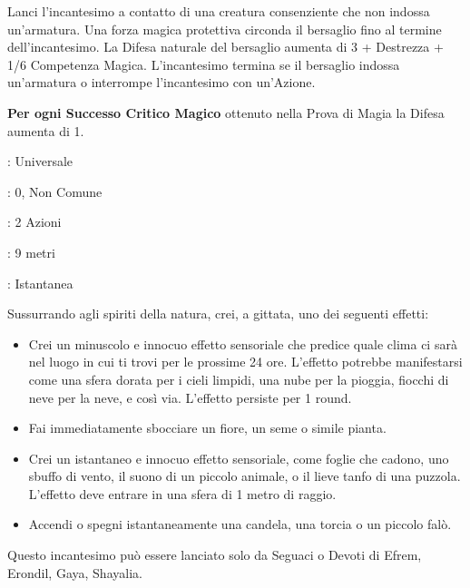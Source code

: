 \begin{multicols}{2}
Lanci l'incantesimo a contatto di una creatura consenziente che non indossa un'armatura. Una forza magica protettiva circonda il bersaglio fino al termine dell'incantesimo. La Difesa naturale del bersaglio aumenta di 3 + Destrezza + 1/6 Competenza Magica. L'incantesimo termina se il bersaglio indossa un'armatura o interrompe l'incantesimo con un'Azione.

\textbf{Per ogni Successo Critico Magico} ottenuto nella Prova di Magia la Difesa aumenta di 1.

\noindent\colorbox{OBSSgold!10}{
\begin{minipage}{0.95\linewidth}
\begin{description}[noitemsep, topsep=0pt, parsep=0pt, partopsep=0pt, leftmargin=0cm, labelwidth=1.3cm]
	\item[\textbf{Lista}]: Universale
	\item[\textbf{Livello}]: 0, Non Comune
	\item[\textbf{Lancio}]: 2 Azioni
	\item[\textbf{Gittata}]: 9 metri
	\item[\textbf{Durata}]: Istantanea
\end{description}
\end{minipage}}\smallskip

Sussurrando agli spiriti della natura, crei, a gittata, uno dei seguenti effetti:

\begin{itemize}[leftmargin=*] \setlength{\itemsep}{0pt}
	\item Crei un minuscolo e innocuo effetto sensoriale che predice quale clima ci sarà nel luogo in cui ti trovi per le prossime 24 ore. L'effetto potrebbe manifestarsi come una sfera dorata per i cieli limpidi, una nube per la pioggia, fiocchi di neve per la neve, e così via. L'effetto persiste per 1 round.
	\item Fai immediatamente sbocciare un fiore, un seme o simile pianta.
	\item Crei un istantaneo e innocuo effetto sensoriale, come foglie che cadono, uno sbuffo di vento, il suono di un piccolo animale, o il lieve tanfo di una puzzola. L'effetto deve entrare in una sfera di 1 metro di raggio.
	\item Accendi o spegni istantaneamente una candela, una torcia o un piccolo falò.
\end{itemize}

Questo incantesimo può essere lanciato solo da Seguaci o Devoti di Efrem, Erondil, Gaya, Shayalia.


\end{multicols}
